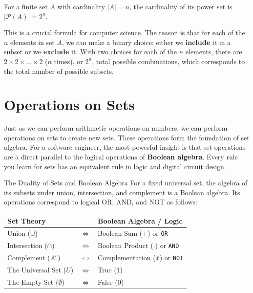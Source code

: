 \begin{remark}
    For a finite set $A$ with cardinality $|A| = n$, the cardinality of its power set is $|\mathcal{P}(A)| = 2^n$.
    
    This is a crucial formula for computer science. The reason is that for each of the $n$ elements in set $A$, we can make a binary choice: either we \textbf{include} it in a subset or we \textbf{exclude} it. With two choices for each of the $n$ elements, there are $2 \times 2 \times \dots \times 2$ ($n$ times), or $2^n$, total possible combinations, which corresponds to the total number of possible subsets.
\end{remark}



\section{Operations on Sets}
Just as we can perform arithmetic operations on numbers, we can perform operations on sets to create new sets. These operations form the foundation of set algebra. For a software engineer, the most powerful insight is that set operations are a direct parallel to the logical operations of \textbf{Boolean algebra}. Every rule you learn for sets has an equivalent rule in logic and digital circuit design.

\begin{custombox}{The Duality of Sets and Boolean Algebra}
    For a fixed universal set, the algebra of its subsets under union, intersection, and complement is a Boolean algebra. Its operations correspond to logical OR, AND, and NOT as follows:
    \begin{center}
    \renewcommand{\arraystretch}{1.3}
    \begin{tabular}{lcl}
        \textbf{Set Theory} & & \textbf{Boolean Algebra / Logic} \\
        \hline
        Union ($\cup$) & $\iff$ & Boolean Sum ($+$) or \texttt{OR} \\
        Intersection ($\cap$) & $\iff$ & Boolean Product ($\cdot$) or \texttt{AND} \\
        Complement ($A^c$) & $\iff$ & Complementation ($\overline{x}$) or \texttt{NOT} \\
        The Universal Set ($U$) & $\iff$ & True (1) \\
        The Empty Set ($\emptyset$) & $\iff$ & False (0) \\
    \end{tabular}
    \end{center}
\end{custombox}


